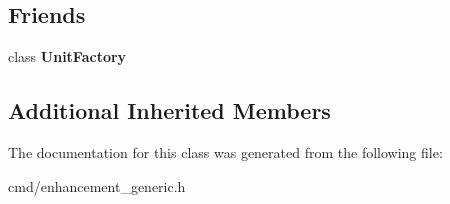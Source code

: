 \subsection*{Friends}
\begin{DoxyCompactItemize}
\item 
class {\bfseries Unit\+Factory}\hypertarget{classEnhancement_a187c66d2d867f6265d3b0c99ffc34838}{}\label{classEnhancement_a187c66d2d867f6265d3b0c99ffc34838}

\end{DoxyCompactItemize}
\subsection*{Additional Inherited Members}


The documentation for this class was generated from the following file\+:\begin{DoxyCompactItemize}
\item 
cmd/enhancement\+\_\+generic.\+h\end{DoxyCompactItemize}
